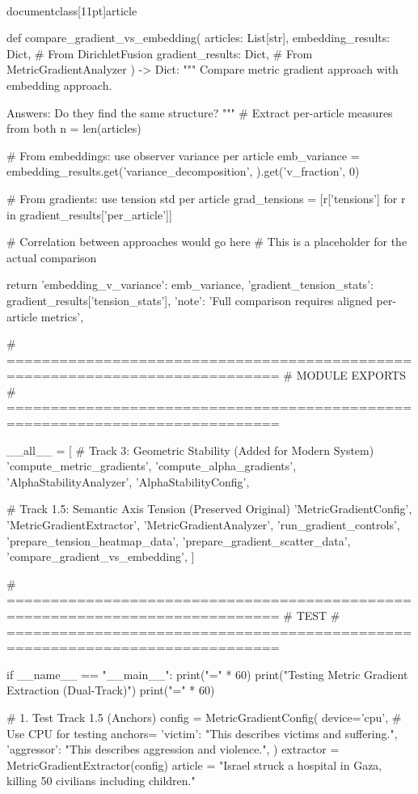 \\documentclass[11pt]{article}
\begin{document}
\begin{CodeBlock}
def compare_gradient_vs_embedding(
    articles: List[str],
    embedding_results: Dict,  # From DirichletFusion
    gradient_results: Dict,   # From MetricGradientAnalyzer
) -> Dict:
    """
    Compare metric gradient approach with embedding approach.
    
    Answers: Do they find the same structure?
    """
    # Extract per-article measures from both
    n = len(articles)
    
    # From embeddings: use observer variance per article
    emb_variance = embedding_results.get('variance_decomposition', {}).get('v_fraction', 0)
    
    # From gradients: use tension std per article
    grad_tensions = [r['tensions'] for r in gradient_results['per_article']]
    
    # Correlation between approaches would go here
    # This is a placeholder for the actual comparison
    
    return {
        'embedding_v_variance': emb_variance,
        'gradient_tension_stats': gradient_results['tension_stats'],
        'note': 'Full comparison requires aligned per-article metrics',
    }


# =============================================================================
# MODULE EXPORTS
# =============================================================================

__all__ = [
    # Track 3: Geometric Stability (Added for Modern System)
    'compute_metric_gradients',
    'compute_alpha_gradients',
    'AlphaStabilityAnalyzer',
    'AlphaStabilityConfig',
    
    # Track 1.5: Semantic Axis Tension (Preserved Original)
    'MetricGradientConfig',
    'MetricGradientExtractor',
    'MetricGradientAnalyzer',
    'run_gradient_controls',
    'prepare_tension_heatmap_data',
    'prepare_gradient_scatter_data',
    'compare_gradient_vs_embedding',
]


# =============================================================================
# TEST
# =============================================================================

if __name__ == "__main__":
    print("=" * 60)
    print("Testing Metric Gradient Extraction (Dual-Track)")
    print("=" * 60)
    
    # 1. Test Track 1.5 (Anchors)
    config = MetricGradientConfig(
        device='cpu',  # Use CPU for testing
        anchors={
            'victim': "This describes victims and suffering.",
            'aggressor': "This describes aggression and violence.",
        }
    )
    extractor = MetricGradientExtractor(config)
    article = "Israel struck a hospital in Gaza, killing 50 civilians including children."
    

\end{CodeBlock}
\end{document}

